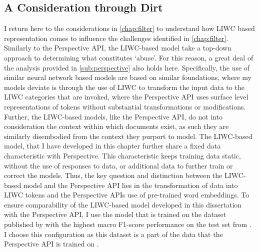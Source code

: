 
\subsection{A Consideration through Dirt}\label{sub:liwc_model}

I return here to the considerations in \cref{chap:filter} to understand how LIWC based representation comes to influence the challenges identified in \cref{chap:filter}.
Similarly to the Perspective API, the LIWC-based model take a top-down approach to determining what constitutes `abuse'. For this reason, a great deal of the analysis provided in \autoref{sub:perspective} also holds here. Specifically, the use of similar neural network based models are based on similar foundations, where my models deviate is through the use of LIWC \cite{Pennebaker:2001} to transform the input data to the LIWC categories that are invoked, where the Perspective API uses surface level representations of tokens without substantial transformations or modifications. Further, the LIWC-based models, like the Perspective API, do not into consideration the context within which documents exist, as such they are similarly disembodied from the context they purport to model. The LIWC-based model, that I have developed in this chapter further share a fixed data characteristic with Perspective. This characteristic keeps training data static, without the use of responses to data, or additional data to further train or correct the models. Thus, the key question and distinction between the LIWC-based model and the Perspective API lies in the transformation of data into LIWC tokens and the Perspective APIs use of pre-trained word embeddings. To ensure comparability of the LIWC-based model developed in this dissertation with the Perspective API, I use the model that is trained on the dataset published by \citet{Wulczyn:2017} with the highest macro F1-score performance on the test set from \citet{Wulczyn:2017}. I choose this configuration as this dataset is a part of the data that the Perspective API is trained on \citep{Perspective:Github}.

